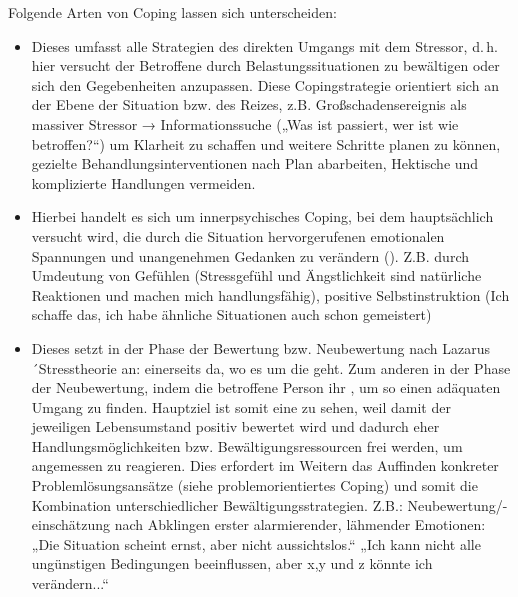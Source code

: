 {Folgende Arten von Coping lassen sich unterscheiden\cite{ZimbardoPsych6}:

\begin{itemize}
  \item {}
  Dieses umfasst alle Strategien des direkten Umgangs mit dem
  Stressor, d.\,h. hier versucht der Betroffene durch
   Belastungssituationen zu
  bewältigen oder sich den Gegebenheiten anzupassen. Diese
  Copingstrategie orientiert sich an der Ebene der Situation
  bzw. des Reizes, z.B. Großschadensereignis als massiver Stressor → Informationssuche („Was ist passiert, wer ist wie betroffen?“) um Klarheit zu schaffen und weitere Schritte planen zu können, gezielte Behandlungsinterventionen nach Plan abarbeiten, Hektische und komplizierte Handlungen vermeiden.
  \item {}
  Hierbei handelt es sich um innerpsychisches Coping, bei dem
  hauptsächlich versucht wird, die durch die Situation
  hervorgerufenen emotionalen Spannungen und unangenehmen
  Gedanken zu verändern (). Z.B. durch Umdeutung von Gefühlen (Stressgefühl und Ängstlichkeit sind natürliche Reaktionen und machen mich handlungsfähig), positive Selbstinstruktion (Ich schaffe das, ich habe ähnliche Situationen auch schon gemeistert)
  \item {}
  Dieses setzt in der Phase der Bewertung bzw. Neubewertung
  nach Lazarus´Stresstheorie an: einerseits da, wo es um die
   geht. Zum anderen in der Phase
  der Neubewertung, indem die betroffene Person ihr
  , um so
  einen adäquaten Umgang zu finden. Hauptziel ist somit eine
   zu sehen, weil damit
  der jeweiligen Lebensumstand positiv bewertet wird und
  dadurch eher Handlungsmöglichkeiten bzw.
  Bewältigungsressourcen frei werden, um angemessen zu
  reagieren. Dies erfordert im Weitern das Auffinden konkreter
  Problemlösungsansätze (siehe problemorientiertes Coping) und
  somit die Kombination unterschiedlicher
  Bewältigungsstrategien. Z.B.: Neubewertung/-einschätzung nach Abklingen erster alarmierender, lähmender Emotionen: „Die Situation scheint ernst, aber nicht aussichtslos.“ „Ich kann nicht alle ungünstigen Bedingungen beeinflussen, aber x,y und z könnte ich verändern...“
\end{itemize}

}
{}
{}
{}
{}




